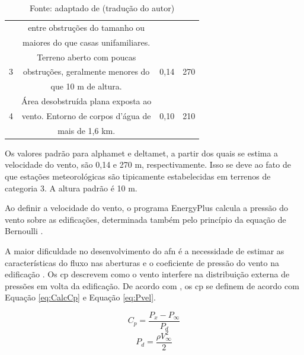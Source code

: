 \documentclass[brazil,hardcopy,openany]{ufscthesis} %
\newcommand{\source}[1]{\small \caption*{Fonte: {#1}} } %
\begin{document}
\begin{table}[h]
{\begin{tabular}{|c |c |c |c | }
			{} & entre obstruções do tamanho ou & {} & \\
			{} & maiores do que casas unifamiliares. & {} & \\
			\hline
			{} & Terreno aberto com poucas & {} & \\
			3 & obstruções, geralmente menores do & 0,14 & 270  \\
			{} & que 10 m de altura. & {} & \\
			\hline
			{} & Área desobstruída plana exposta ao & {} & \\
			4 & vento. Entorno de corpos d’água de & 0,10 & 210  \\
			{} & mais de 1,6 km. & {} & \\
			\hline
			
		\end{tabular}
	}
	\source{adaptado de  (tradução do autor)}
\end{table}

Os valores padrão para \gls{alphamet} e \gls{deltamet}, a partir dos quais se estima a velocidade do vento, são 0,14 e 270 m, respectivamente. Isso se deve ao fato de que estações meteorológicas são tipicamente estabelecidas em terrenos de categoria 3. A altura padrão é 10 m. 

Ao definir a velocidade do vento, o programa EnergyPlus calcula a pressão do vento sobre as edificações, determinada também pelo princípio da equação de Bernoulli \cite{Walton1989}.

A maior dificuldade no desenvolvimento do \acrshort{afn} é a necessidade de estimar as características do fluxo nas aberturas e o coeficiente de pressão do vento na edificação \cite{Arendt2017}. Os \acrfull{cp} descrevem como o vento interfere na distribuição externa de pressões em volta da edificação. 
De acordo com , os \acrshort{cp} se definem de acordo com Equação \ref{eq:CalcCp} e Equação \ref{eq:Pvel}.

\begin{equation}\label{eq:CalcCp}
C_p = \frac{P_x - P_{\infty}}{P_d}
\end{equation}
\begin{equation}\label{eq:Pvel}
P_d = \frac{\rho V^{2}_{\infty}}{2}
\end{equation}
\end{document}
